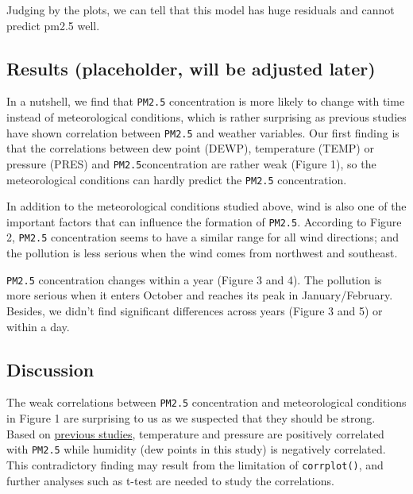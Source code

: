 \documentclass[]{article}
\begin{document}
Judging by the plots, we can tell that this model has huge residuals and
cannot predict pm2.5 well.

\hypertarget{results-placeholder-will-be-adjusted-later}{%
\subsection{Results (placeholder, will be adjusted
later)}\label{results-placeholder-will-be-adjusted-later}}

In a nutshell, we find that \texttt{PM2.5} concentration is more likely
to change with time instead of meteorological conditions, which is
rather surprising as previous studies have shown correlation between
\texttt{PM2.5} and weather variables. Our first finding is that the
correlations between dew point (DEWP), temperature (TEMP) or pressure
(PRES) and \texttt{PM2.5}concentration are rather weak (Figure 1), so
the meteorological conditions can hardly predict the \texttt{PM2.5}
concentration.

In addition to the meteorological conditions studied above, wind is also
one of the important factors that can influence the formation of
\texttt{PM2.5}. According to Figure 2, \texttt{PM2.5} concentration
seems to have a similar range for all wind directions; and the pollution
is less serious when the wind comes from northwest and southeast.

\texttt{PM2.5} concentration changes within a year (Figure 3 and 4). The
pollution is more serious when it enters October and reaches its peak in
January/February. Besides, we didn't find significant differences across
years (Figure 3 and 5) or within a day.

\hypertarget{discussion}{%
\subsection{Discussion}\label{discussion}}

The weak correlations between \texttt{PM2.5} concentration and
meteorological conditions in Figure 1 are surprising to us as we
suspected that they should be strong. Based on
\href{https://www.atmos-chem-phys.net/18/5343/2018/acp-18-5343-2018.pdf}{previous
studies}, temperature and pressure are positively correlated with
\texttt{PM2.5} while humidity (dew points in this study) is negatively
correlated. This contradictory finding may result from the limitation of
\texttt{corrplot()}, and further analyses such as t-test are needed to
study the correlations.
\end{document}
